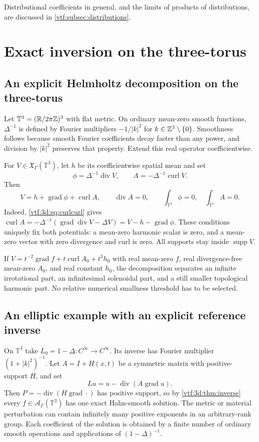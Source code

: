 \documentclass[11pt,letterpaper]{article}
\theoremstyle{definition}
\theoremstyle{remark}
\newcommand{\R}{\mathbb R}\newcommand{\C}{\mathbb C}
\newcommand{\A}{\mathscr A}\newcommand{\OO}{\mathcal O}\newcommand{\mm}{\mathfrak m}
\newcommand{\supp}{\operatorname{supp}}\newcommand{\st}{\operatorname{st}}
\newcommand{\grad}{\operatorname{grad}}\newcommand{\Div}{\operatorname{div}}
\newcommand{\curl}{\operatorname{curl}}
\begin{document}
Distributional coefficients in general, and the limits of products of
distributions, are discussed in \cref{vtf:subsec:distributions}.

\section{Exact inversion on the three-torus}\label{vtf:3d:sec:torus}

\subsection{An explicit Helmholtz decomposition on the three-torus}
Let $\mathbb T^3=(\R/2\pi\Z)^3$ with flat metric. On ordinary mean-zero smooth functions, $\Delta^{-1}$ is defined by Fourier multipliers $-1/|k|^2$ for $k\in\mathbb Z^3\setminus\{0\}$. Smoothness follows because smooth Fourier coefficients decay faster than any power, and division by $|k|^2$ preserves that property. Extend this real operator coefficientwise.

For $V\in\mathfrak X_\Gamma(\mathbb T^3)$, let $h$ be its coefficientwise spatial mean and set
\[
 \phi=\Delta^{-1}\Div V,\qquad
 A=-\Delta^{-1}\curl V.
\]
Then
\begin{equation}\label{vtf:3d:eq:helmholtz}
 V=h+\grad\phi+\curl A,\qquad
 \Div A=0,\qquad \int_{\mathbb T^3}\phi=0,\quad
 \int_{\mathbb T^3}A=0.
\end{equation}
Indeed, \eqref{vtf:3d:eq:curlcurl} gives
$\curl A=-\Delta^{-1}(\grad\Div V-\Delta V)=V-h-\grad\phi$.
These conditions uniquely fix both potentials: a mean-zero harmonic scalar is zero, and a mean-zero vector with zero divergence and curl is zero. All supports stay inside $\supp V$.

If $V=t^{-2}\grad f+t\curl A_0+t^3h_0$ with real mean-zero $f$, real divergence-free mean-zero $A_0$, and real constant $h_0$, the decomposition separates an infinite irrotational part, an infinitesimal solenoidal part, and a still smaller topological harmonic part. No relative numerical smallness threshold has to be selected.

\subsection{An elliptic example with an explicit reference inverse}
On $\mathbb T^3$ take $L_0=1-\Delta:C^\infty\to C^\infty$. Its inverse has Fourier multiplier $(1+|k|^2)^{-1}$. Let $A=I+H(x,t)$ be a symmetric matrix with positive-support $H$, and set
\[
 Lu=u-\Div(A\grad u).
\]
Then $P=-\Div(H\grad\cdot)$ has positive support, so by \cref{vtf:3d:thm:inverse} every $f\in\A_\Gamma(\mathbb T^3)$ has one
exact Hahn-smooth solution. The metric or material perturbation can contain infinitely many positive exponents in an arbitrary-rank group. Each coefficient of the solution is obtained by a finite number of ordinary smooth operations and applications of $(1-\Delta)^{-1}$.
\end{document}
